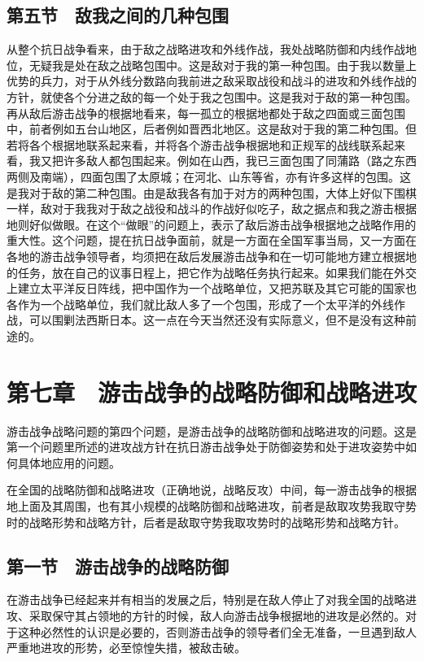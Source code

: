 \subsection{第五节　敌我之间的几种包围}

从整个抗日战争看来，由于敌之战略进攻和外线作战，我处战略防御和内线作战地位，无疑我是处在敌之战略包围中。这是敌对于我的第一种包围。由于我以数量上优势的兵力，对于从外线分数路向我前进之敌采取战役和战斗的进攻和外线作战的方针，就使各个分进之敌的每一个处于我之包围中。这是我对于敌的第一种包围。再从敌后游击战争的根据地看来，每一孤立的根据地都处于敌之四面或三面包围中，前者例如五台山地区，后者例如晋西北地区。这是敌对于我的第二种包围。但若将各个根据地联系起来看，并将各个游击战争根据地和正规军的战线联系起来看，我又把许多敌人都包围起来。例如在山西，我已三面包围了同蒲路（路之东西两侧及南端），四面包围了太原城；在河北、山东等省，亦有许多这样的包围。这是我对于敌的第二种包围。由是敌我各有加于对方的两种包围，大体上好似下围棋一样，敌对于我我对于敌之战役和战斗的作战好似吃子，敌之据点和我之游击根据地则好似做眼。在这个“做眼”的问题上，表示了敌后游击战争根据地之战略作用的重大性。这个问题，提在抗日战争面前，就是一方面在全国军事当局，又一方面在各地的游击战争领导者，均须把在敌后发展游击战争和在一切可能地方建立根据地的任务，放在自己的议事日程上，把它作为战略任务执行起来。如果我们能在外交上建立太平洋反日阵线，把中国作为一个战略单位，又把苏联及其它可能的国家也各作为一个战略单位，我们就比敌人多了一个包围，形成了一个太平洋的外线作战，可以围剿法西斯日本。这一点在今天当然还没有实际意义，但不是没有这种前途的。

\section{第七章　游击战争的战略防御和战略进攻}

游击战争战略问题的第四个问题，是游击战争的战略防御和战略进攻的问题。这是第一个问题里所述的进攻战方针在抗日游击战争处于防御姿势和处于进攻姿势中如何具体地应用的问题。

在全国的战略防御和战略进攻（正确地说，战略反攻）中间，每一游击战争的根据地上面及其周围，也有其小规模的战略防御和战略进攻，前者是敌取攻势我取守势时的战略形势和战略方针，后者是敌取守势我取攻势时的战略形势和战略方针。

\subsection{第一节　游击战争的战略防御}

在游击战争已经起来并有相当的发展之后，特别是在敌人停止了对我全国的战略进攻、采取保守其占领地的方针的时候，敌人向游击战争根据地的进攻是必然的。对于这种必然性的认识是必要的，否则游击战争的领导者们全无准备，一旦遇到敌人严重地进攻的形势，必至惊惶失措，被敌击破。

